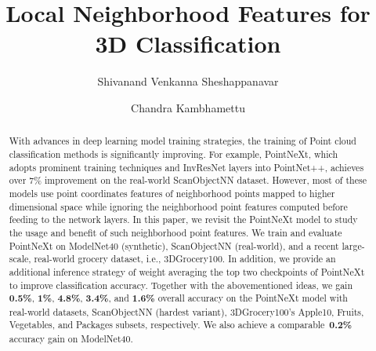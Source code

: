 \documentclass[runningheads]{llncs}
\begin{document}
\title{Local Neighborhood Features for 3D Classification}


\author{Shivanand Venkanna Sheshappanavar \and
Chandra Kambhamettu}
\maketitle              \begin{abstract}
With advances in deep learning model training strategies, the training of Point cloud classification methods is significantly improving. For example, PointNeXt, which adopts prominent training techniques and InvResNet layers into PointNet++, achieves over 7\% improvement on the real-world ScanObjectNN dataset. However, most of these models use point coordinates features of neighborhood points mapped to higher dimensional space while ignoring the neighborhood point features computed before feeding to the network layers. In this paper, we revisit the PointNeXt model to study the usage and benefit of such neighborhood point features. We train and evaluate PointNeXt on ModelNet40 (synthetic), ScanObjectNN (real-world), and a recent large-scale, real-world grocery dataset, i.e., 3DGrocery100. In addition, we provide an additional inference strategy of weight averaging the top two checkpoints of PointNeXt to improve classification accuracy. Together with the abovementioned ideas, we gain \textbf{0.5\%}, \textbf{1\%}, \textbf{4.8\%}, \textbf{3.4\%}, and \textbf{1.6\%} overall accuracy on the PointNeXt model with real-world datasets, ScanObjectNN (hardest variant), 3DGrocery100's Apple10, Fruits, Vegetables, and Packages subsets, respectively. We also achieve a comparable~\textbf{0.2\%} accuracy gain on ModelNet40. 

\end{abstract}
\end{document}
